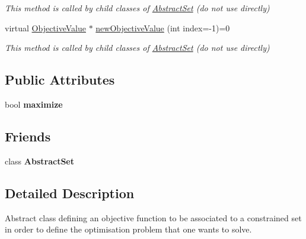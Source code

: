 \begin{DoxyCompactItemize}
\begin{DoxyCompactList}\small\item\em This method is called by child classes of \hyperlink{classAbstractSet}{Abstract\-Set} (do not use directly) \end{DoxyCompactList}\item 
\hypertarget{classObjectiveFunction_a4d302f7cdf40ca80d6d186cbf8851b8f}{virtual \hyperlink{classObjectiveValue}{Objective\-Value} $\ast$ \hyperlink{classObjectiveFunction_a4d302f7cdf40ca80d6d186cbf8851b8f}{new\-Objective\-Value} (int index=-\/1)=0}\label{classObjectiveFunction_a4d302f7cdf40ca80d6d186cbf8851b8f}

\begin{DoxyCompactList}\small\item\em This method is called by child classes of \hyperlink{classAbstractSet}{Abstract\-Set} (do not use directly) \end{DoxyCompactList}\end{DoxyCompactItemize}
\subsection*{Public Attributes}
\begin{DoxyCompactItemize}
\item 
\hypertarget{classObjectiveFunction_a325f3c8284ebfac0a170e0b8143dd7b5}{bool {\bfseries maximize}}\label{classObjectiveFunction_a325f3c8284ebfac0a170e0b8143dd7b5}

\end{DoxyCompactItemize}
\subsection*{Friends}
\begin{DoxyCompactItemize}
\item 
\hypertarget{classObjectiveFunction_ab0bb5b94706efff511fee401e71bf087}{class {\bfseries Abstract\-Set}}\label{classObjectiveFunction_ab0bb5b94706efff511fee401e71bf087}

\end{DoxyCompactItemize}


\subsection{Detailed Description}
Abstract class defining an objective function to be associated to a constrained set in order to define the optimisation problem that one wants to solve. 

